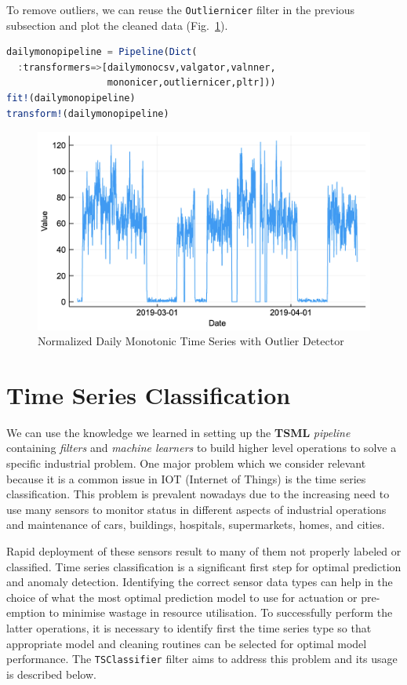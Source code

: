 \documentclass{juliacon}
\begin{document}
To remove outliers, we can reuse the \texttt{Outliernicer} filter in the previous subsection and plot the cleaned data (Fig.~\ref{fig:outndailymono}).

\begin{lstlisting}[language = Julia]
dailymonopipeline = Pipeline(Dict(
  :transformers=>[dailymonocsv,valgator,valnner,
                  mononicer,outliernicer,pltr]))
fit!(dailymonopipeline)
transform!(dailymonopipeline)
\end{lstlisting}

\begin{figure}[htbp]
   \centering
   \includegraphics[width=\columnwidth]{outnormdailymono.png}  %
   \caption{Normalized Daily Monotonic Time Series with Outlier Detector}
   \label{fig:outndailymono}
\end{figure}


\section{Time Series Classification}

We can use the knowledge we learned in setting up the \textbf{TSML}
\emph{pipeline} containing \emph{filters} and \emph{machine learners} to build higher level
operations to solve a specific industrial problem. One major problem
which we consider relevant because it is a common issue in IOT (Internet of Things) 
 is the time series classification. This problem is prevalent nowadays 
due to the increasing need to use many sensors to monitor status in different aspects of industrial
operations and maintenance of cars, buildings, hospitals, supermarkets, homes, and cities.

\vskip 6pt

Rapid deployment of these sensors result to many of them not properly labeled or classified.
Time series classification is a significant first step for optimal prediction and anomaly detection.
Identifying the correct sensor data types can help in the choice of what the most optimal prediction 
model to use for actuation or pre-emption to minimise wastage in resource utilisation.
To successfully perform the latter operations, it is necessary to identify first the time series
type so that appropriate model and cleaning routines can be selected for optimal model performance. The  \texttt{TSClassifier} filter aims to address this problem and its usage is described below.
\end{document}
